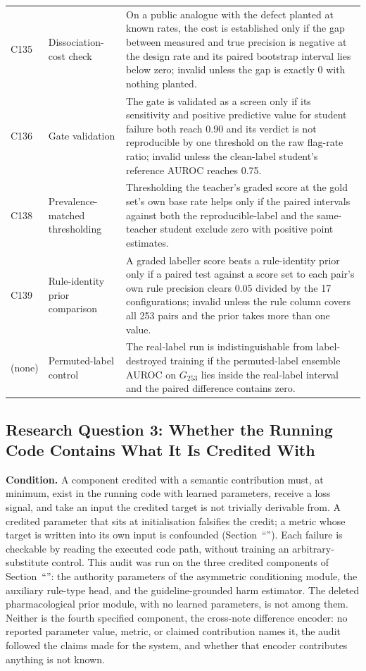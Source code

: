 \begin{longtable}{@{}>{\tblragged}p{0.75in}>{\tblragged}p{1.6in}>{\tblragged}p{3.3in}@{}}
\addlinespace[3pt]
C135 & Dissociation-cost check & On a public analogue with the defect planted at known rates, the cost is established only if the gap between measured and true precision is negative at the design rate and its paired bootstrap interval lies below zero; invalid unless the gap is exactly 0 with nothing planted. \\
\addlinespace[3pt]
C136 & Gate validation & The gate is validated as a screen only if its sensitivity and positive predictive value for student failure both reach 0.90 and its verdict is not reproducible by one threshold on the raw flag-rate ratio; invalid unless the clean-label student's reference AUROC reaches 0.75. \\
\addlinespace[3pt]
C138 & Prevalence-matched thresholding & Thresholding the teacher's graded score at the gold
set's own base rate helps only if the paired intervals against both the reproducible-label
and the same-teacher student exclude zero with positive point estimates. \\
\addlinespace[3pt]
C139 & Rule-identity prior comparison & A graded labeller score beats a rule-identity prior only
if a paired test against a score set to each pair's own rule precision clears 0.05 divided by the
17 configurations; invalid unless the rule column covers all 253 pairs and the prior takes more
than one value. \\
\addlinespace[3pt]
(none) & Permuted-label control & The real-label run is indistinguishable from label-destroyed training if the permuted-label ensemble AUROC on $G_{253}$ lies inside the real-label interval and the paired difference contains zero. \\
\end{longtable}
\endgroup

\subsection{Research Question 3: Whether the Running Code Contains What It Is Credited With}
\label{sec:m-control-rq3}

\textbf{Condition.} A component credited with a semantic contribution must, at minimum, exist in the
running code with learned parameters, receive a loss signal, and take an input the credited target is
not trivially derivable from. A credited parameter that sits at initialisation falsifies the credit;
a metric whose target is written into its own input is confounded
(Section~``''). Each failure is checkable by reading the executed
code path, without training an arbitrary-substitute control.
This audit was run on the three credited components of Section~``'': the
authority parameters of the asymmetric conditioning module, the auxiliary rule-type head, and the
guideline-grounded harm estimator. The deleted pharmacological prior module, with no learned
parameters, is not among them. Neither is the fourth specified component, the cross-note difference
encoder: no reported parameter value, metric, or claimed contribution names it, the audit
followed the claims made for the system, and whether that encoder contributes anything is
not known.

